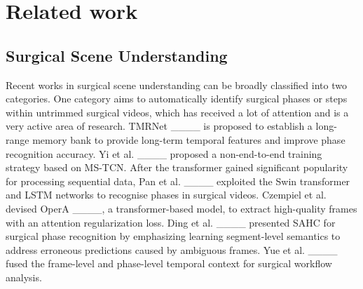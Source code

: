 \section{Related work}
\subsection{Surgical Scene Understanding} 
Recent works in surgical scene understanding can be broadly classified into two categories. One category aims to automatically identify surgical phases or steps within untrimmed surgical videos, which has received a lot of attention and is a very active area of research. TMRNet ____ is proposed to establish a long-range memory bank to provide long-term temporal features and improve phase recognition accuracy. 
Yi et al.  ____ proposed a non-end-to-end training strategy based on MS-TCN. After the transformer gained significant popularity for processing sequential data, Pan et al.  ____ exploited the Swin transformer and LSTM networks 
to recognise phases in surgical videos. Czempiel et al. devised OperA ____, a transformer-based model, to extract high-quality frames with an attention regularization loss.  Ding et al. ____ presented SAHC for surgical phase recognition by emphasizing learning segment-level semantics to address erroneous predictions caused by ambiguous frames. Yue et al. ____ fused the frame-level and phase-level temporal context for surgical workflow analysis. 

